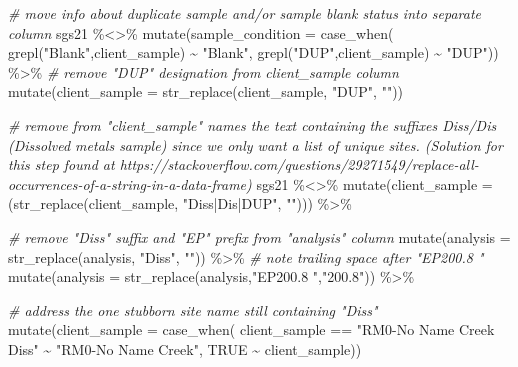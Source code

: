 \documentclass[
]{book}
\newenvironment{Shaded}{\begin{snugshade}}{\end{snugshade}}
\newcommand{\AttributeTok}[1]{\textcolor[rgb]{0.77,0.63,0.00}{#1}}
\newcommand{\CommentTok}[1]{\textcolor[rgb]{0.56,0.35,0.01}{\textit{#1}}}
\newcommand{\ConstantTok}[1]{\textcolor[rgb]{0.00,0.00,0.00}{#1}}
\newcommand{\FunctionTok}[1]{\textcolor[rgb]{0.00,0.00,0.00}{#1}}
\newcommand{\NormalTok}[1]{#1}
\newcommand{\SpecialCharTok}[1]{\textcolor[rgb]{0.00,0.00,0.00}{#1}}
\newcommand{\StringTok}[1]{\textcolor[rgb]{0.31,0.60,0.02}{#1}}
\begin{document}
\begin{Shaded}
\begin{Highlighting}[]
  
\CommentTok{\# move info about duplicate sample and/or sample blank status into separate column}
\NormalTok{sgs21 }\SpecialCharTok{\%\textless{}\textgreater{}\%}
  \FunctionTok{mutate}\NormalTok{(}\AttributeTok{sample\_condition =} \FunctionTok{case\_when}\NormalTok{(}
    \FunctionTok{grepl}\NormalTok{(}\StringTok{"Blank"}\NormalTok{,client\_sample) }\SpecialCharTok{\textasciitilde{}} \StringTok{"Blank"}\NormalTok{,}
    \FunctionTok{grepl}\NormalTok{(}\StringTok{"DUP"}\NormalTok{,client\_sample) }\SpecialCharTok{\textasciitilde{}} \StringTok{"DUP"}\NormalTok{)) }\SpecialCharTok{\%\textgreater{}\%}
  \CommentTok{\# remove "DUP" designation from client\_sample column}
  \FunctionTok{mutate}\NormalTok{(}\AttributeTok{client\_sample =} \FunctionTok{str\_replace}\NormalTok{(client\_sample, }\StringTok{"DUP"}\NormalTok{, }\StringTok{""}\NormalTok{)) }

  
\CommentTok{\# remove from "client\_sample" names the text containing the suffixes Diss/Dis (Dissolved metals sample) since we only want a list of unique sites. (Solution for this step found at https://stackoverflow.com/questions/29271549/replace{-}all{-}occurrences{-}of{-}a{-}string{-}in{-}a{-}data{-}frame)}
\NormalTok{sgs21 }\SpecialCharTok{\%\textless{}\textgreater{}\%}  
  \FunctionTok{mutate}\NormalTok{(}\AttributeTok{client\_sample =}\NormalTok{ (}\FunctionTok{str\_replace}\NormalTok{(client\_sample, }\StringTok{"Diss|Dis|DUP"}\NormalTok{, }\StringTok{""}\NormalTok{))) }\SpecialCharTok{\%\textgreater{}\%}
  
  \CommentTok{\# remove "Diss" suffix and "EP" prefix from "analysis" column}
  \FunctionTok{mutate}\NormalTok{(}\AttributeTok{analysis =} \FunctionTok{str\_replace}\NormalTok{(analysis, }\StringTok{"Diss"}\NormalTok{, }\StringTok{""}\NormalTok{)) }\SpecialCharTok{\%\textgreater{}\%}
  \CommentTok{\# note trailing space after "EP200.8 "}
  \FunctionTok{mutate}\NormalTok{(}\AttributeTok{analysis =} \FunctionTok{str\_replace}\NormalTok{(analysis,}\StringTok{"EP200.8 "}\NormalTok{,}\StringTok{"200.8"}\NormalTok{)) }\SpecialCharTok{\%\textgreater{}\%}

  \CommentTok{\# address the one stubborn site name still containing "Diss"}
  \FunctionTok{mutate}\NormalTok{(}\AttributeTok{client\_sample =} \FunctionTok{case\_when}\NormalTok{(}
\NormalTok{    client\_sample }\SpecialCharTok{==} \StringTok{"RM0{-}No Name Creek  Diss"} \SpecialCharTok{\textasciitilde{}} \StringTok{"RM0{-}No Name Creek"}\NormalTok{,}
    \ConstantTok{TRUE} \SpecialCharTok{\textasciitilde{}}\NormalTok{ client\_sample)) }
  

\end{Highlighting}
\end{Shaded}
\end{document}
